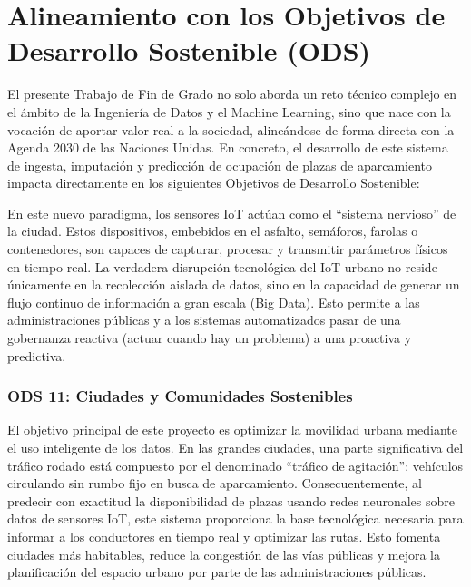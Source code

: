 \chapter{Alineamiento con los Objetivos de Desarrollo Sostenible (ODS)}
\label{sec:obj_ds}

El presente Trabajo de Fin de Grado no solo aborda un reto técnico complejo en el ámbito de la Ingeniería de Datos y el Machine Learning, sino que nace con la vocación de aportar valor real a la sociedad, alineándose de forma directa con la Agenda 2030 de las Naciones Unidas. En concreto, el desarrollo de este sistema de ingesta, imputación y predicción de ocupación de plazas de aparcamiento impacta directamente en los siguientes Objetivos de Desarrollo Sostenible:

En este nuevo paradigma, los sensores IoT actúan como el ``sistema nervioso'' de la ciudad. Estos dispositivos, embebidos en el asfalto, semáforos, farolas o contenedores, son capaces de capturar, procesar y transmitir parámetros físicos en tiempo real. La verdadera disrupción tecnológica del IoT urbano no reside únicamente en la recolección aislada de datos, sino en la capacidad de generar un flujo continuo de información a gran escala (Big Data). Esto permite a las administraciones públicas y a los sistemas automatizados pasar de una gobernanza reactiva (actuar cuando hay un problema) a una proactiva y predictiva.

\subsection{ODS 11: Ciudades y Comunidades Sostenibles}
\label{sec:obj_ds}
El objetivo principal de este proyecto es optimizar la movilidad urbana mediante el uso inteligente de los datos. En las grandes ciudades, una parte significativa del tráfico rodado está compuesto por el denominado ``tráfico de agitación'': vehículos circulando sin rumbo fijo en busca de aparcamiento. Consecuentemente, al predecir con exactitud la disponibilidad de plazas usando redes neuronales sobre datos de sensores IoT, este sistema proporciona la base tecnológica necesaria para informar a los conductores en tiempo real y optimizar las rutas. Esto fomenta ciudades más habitables, reduce la congestión de las vías públicas y mejora la planificación del espacio urbano por parte de las administraciones públicas.

